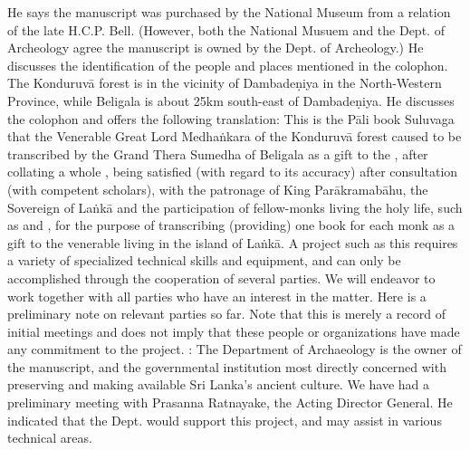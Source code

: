 \markdownRendererUlItem He says the manuscript was purchased by the National Museum from a relation of the late H.C.P. Bell. (However, both the National Musuem and the Dept. of Archeology agree the manuscript is owned by the Dept. of Archeology.)\markdownRendererUlItemEnd 
\markdownRendererUlItem He discusses the identification of the people and places mentioned in the colophon. The Konduruvā forest is in the vicinity of Dambadeṇiya in the North-Western Province, while Beligala is about 25km south-east of Dambadeṇiya.\markdownRendererUlItemEnd 
\markdownRendererUlEndTight \markdownRendererInterblockSeparator
{}He discusses the colophon and offers the following translation:\markdownRendererInterblockSeparator
{}\markdownRendererBlockQuoteBegin
This is the Pāli book Suluvaga that the Venerable Great Lord Medhaṅkara of the Konduruvā forest caused to be transcribed by the Grand Thera Sumedha of Beligala as a gift to the , after collating a whole , being satisfied (with regard to its accuracy) after consultation (with competent scholars), with the patronage of King Parākramabāhu, the Sovereign of Laṅkā and the participation of fellow-monks living the holy life, such as  and , for the purpose of transcribing (providing) one book for each monk as a gift to the venerable  living in the island of Laṅkā.
\markdownRendererBlockQuoteEnd \markdownRendererInterblockSeparator
{}\markdownRendererInterblockSeparator
{}A project such as this requires a variety of specialized technical skills and equipment, and can only be accomplished through the cooperation of several parties. We will endeavor to work together with all parties who have an interest in the matter. Here is a preliminary note on relevant parties so far. Note that this is merely a record of initial meetings and does not imply that these people or organizations have made any commitment to the project.\markdownRendererInterblockSeparator
{}\markdownRendererOlBeginTight
{}: The Department of Archaeology is the owner of the manuscript, and the governmental institution most directly concerned with preserving and making available Sri Lanka’s ancient culture. We have had a preliminary meeting with Prasanna Ratnayake, the Acting Director General. He indicated that the Dept. would support this project, and may assist in various technical areas.\markdownRendererOlItemEnd 
